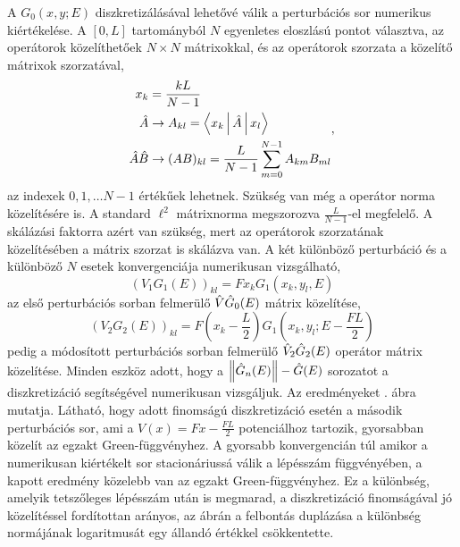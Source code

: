 A $G_0(x,y;E)$ diszkretizálásával lehetővé válik a perturbációs sor numerikus kiértékelése. A $[0,L]$ tartományból $N$ egyenletes eloszlású pontot választva, az operátorok közelíthetőek $N\times N$ mátrixokkal, és az operátorok szorzata a közelítő mátrixok szorzatával,
\begin{equation}
	\begin{aligned}
		x_k&=\frac{kL}{N-1}\\
		\hat{A}&\rightarrow A_{kl}=\Braket{x_k|\hat{A}|x_l}\\
		\hat{A}\hat{B}&\rightarrow (AB)_{kl}=\frac{L}{N-1}\sum_{m=0}^{N-1}A_{km}B_{ml}
	\end{aligned},
\end{equation}
az indexek $0,1,\dots N-1$ értékűek lehetnek. Szükség van még a operátor norma közelítésére is. A standard $\ell^2$ mátrixnorma megszorozva $\frac{L}{N-1}$-el megfelelő. A skálázási faktorra azért van szükség, mert az operátorok szorzatának közelítésében a mátrix szorzat is skálázva van. A két különböző perturbáció és a különböző $N$ esetek konvergenciája numerikusan vizsgálható,
\begin{equation}
	(V_1G_1(E))_{kl}=Fx_kG_1(x_k,y_l,E)
\end{equation}
az első perturbációs sorban felmerülő $\hat{V}\hat{G}_0(E)$ mátrix közelítése,
\begin{equation}
	\left(V_2G_2(E)\right)_{kl}=F\left(x_k-\frac{L}{2}\right)G_1\left(x_k,y_l;E-\frac{FL}{2}\right)
\end{equation}
pedig a módosított perturbációs sorban felmerülő $\hat{V}_2\hat{G}_2(E)$ operátor mátrix közelítése. Minden eszköz adott, hogy a $\left\lVert \hat{G}_n(E) \right\rVert-\hat{G}(E)$ sorozatot a diszkretizáció segítségével numerikusan vizsgáljuk. Az eredményeket . ábra mutatja. Látható, hogy adott finomságú diszkretizáció esetén a második perturbációs sor, ami a $V(x)=Fx-\frac{FL}{2}$ potenciálhoz tartozik, gyorsabban közelít az egzakt Green-függvényhez. A gyorsabb konvergencián túl amikor a numerikusan kiértékelt sor stacionáriussá válik a lépésszám függvényében, a kapott eredmény közelebb van az egzakt Green-függvényhez. Ez a különbség, amelyik tetszőleges lépésszám után is megmarad, a diszkretizáció finomságával jó közelítéssel fordítottan arányos, az ábrán a felbontás duplázása a különbség normájának logaritmusát egy állandó értékkel csökkentette.
